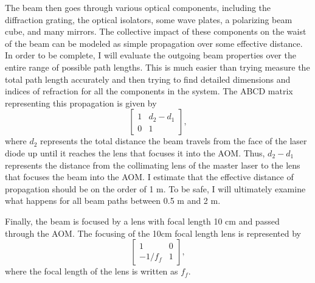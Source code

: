 The beam then goes through various optical components, including the diffraction grating, the optical isolators, some wave plates, a polarizing beam cube, and many mirrors. The collective impact of these components on the waist of the beam can be modeled as simple propagation over some effective distance. %
In order to be complete, I will evaluate the outgoing beam properties over the entire range of possible path lengths. This is much easier than trying measure the total path length accurately and then trying to find detailed dimensions and indices of refraction for all the components in the system. The ABCD matrix representing this propagation is given by
\begin{equation}
\begin{bmatrix}\label{ABCD3}
1 & d_2-d_1 \\ 0 & 1
\end{bmatrix},
\end{equation}
where $d_2$ represents the total distance the beam travels from the face of the laser diode up until it reaches the lens that focuses it into the AOM. Thus, $d_2-d_1$ represents the distance from the collimating lens of the master laser to the lens that focuses the beam into the AOM. 
I estimate that the effective distance of propagation should be on the order of 1 m. To be safe, I will ultimately examine what happens for all beam paths between 0.5 m and 2 m. 

Finally, the beam is focused by a lens with focal length 10 cm and passed through the AOM. The focusing of the 10cm focal length lens is represented by
\begin{equation}
\begin{bmatrix}\label{ABCD4}
1 & 0 \\ -1/f_{f} & 1
\end{bmatrix},
\end{equation} 
where the focal length of the lens is written as $f_{f}$.

